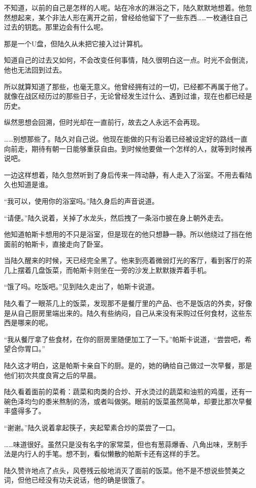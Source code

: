 不知道，以前的自己是怎样的人呢。站在冷水的淋浴之下，陆久默默地想着。他忽然想起来，某个非法人形在离开之前，曾经给他留下了一些东西……一枚通往自己过去的钥匙。那里边会有什么呢。

那是一个U盘，但陆久从未把它接入过计算机。

知道自己的过去又如何，不会改变任何事情，陆久很明白这一点。时光不会倒流，他也无法回到过去。

所以就算知道了那些，也毫无意义。他曾经拥有过的一切，已经都不再属于他了。就像在战区经历过的那些日子，无论曾经发生过什么、遇到过谁，现在也都已经是历史。

纵然思想会回溯，但时光却在一直前行，故去之人永远不会再现。

……别想那些了。陆久对自己说。他现在能做的只有沿着已经被设定好的路线一直向前走，期待有朝一日能够重获自由。到时候他要做一个怎样的人，就等到时候再说吧。

一边这样想着，陆久忽然听到了身后传来一阵动静，有人走入了浴室。不用去看陆久也知道是谁。

“我可以，使用你的浴室吗。”陆久身后的声音说道。

“请便。”陆久说着，关掉了水龙头，然后拽了一条浴巾披在身上朝外走去。

他知道帕斯卡想用的不只是浴室，但是现在的他只想静一静。所以他绕过了挡在他面前的帕斯卡，直接走向了卧室。

当陆久醒来的时候，天已经完全黑了。他来到亮着微弱灯光的客厅，看到客厅的茶几上摆着几盘饭菜，而帕斯卡则坐在一旁的沙发上默默拨弄着手机。

“饿了吗。吃饭吧。”见到陆久走出了，帕斯卡说道。

陆久看了一眼茶几上的饭菜，发现那不是餐厅里的产品、也不是饭店的外卖，好像是从自己厨房里端出来的。陆久有些纳闷，自己从来没有采购过任何食材，这些东西是哪来的呢。

“我从餐厅拿了些食材，在你的厨房里随便加工了一下。”帕斯卡说道，“尝尝吧，希望合你胃口。”

陆久这才明白，这是帕斯卡亲自下的厨。是的，她的确给自己做过一次早餐，那是他们初次共度良宵之后的早晨。

陆久看着面前的菜肴：蔬菜和肉类的合炒、开水烫过的蔬菜和油煎的鸡蛋，还有一碗色泽均匀的黍米熬制的汤，或者叫做粥。眼前的饭菜虽然简单，却要比那次早餐丰盛得多了。

“谢谢。”陆久说着拿起筷子，夹起荤素合炒的菜尝了一口。

……味道很好。虽然只是没有名字的家常菜，但也有葱蒜爆香、八角出味，烹制手法是内行人的手笔。想不到，看似懒散的帕斯卡还有这样的手艺。

陆久赞许地点了点头，风卷残云般地消灭了面前的饭菜。他不是不想说些赞美之词，但他已经没有功夫说话，他的确是很饿了。

